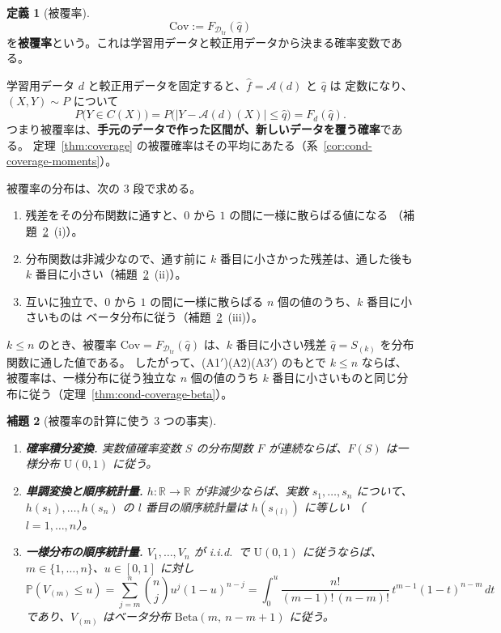 \documentclass[a4paper,11pt]{jsarticle}
\theoremstyle{definition}
\newtheorem{definition}{定義}[section]
\theoremstyle{plain}
\newtheorem{lemma}[definition]{補題}
\theoremstyle{remark}
\newcommand{\Prob}{\mathbb{P}}
\newcommand{\Real}{\mathbb{R}}
\newcommand{\Dtr}{\mathcal{D}_{\mathrm{tr}}}     %
\newcommand{\qhat}{\hat{q}}
\newcommand{\fhat}{\hat{f}}
\begin{document}
\begin{definition}[被覆率]
  \label{def:cond-coverage}
  \begin{equation}
    \label{eq:cond-coverage}
    \mathrm{Cov}:=F_{\Dtr}(\qhat)
  \end{equation}
  を\textbf{被覆率}という。これは学習用データと較正用データから決まる確率変数である。
\end{definition}

学習用データ $d$ と較正用データを固定すると、$\fhat=\mathcal{A}(d)$ と $\qhat$ は
定数になり、$(X,Y)\sim P$ について
\begin{equation*}
  P\bigl(Y\in C(X)\bigr)=P\bigl(|Y-\mathcal{A}(d)(X)|\le\qhat\bigr)=F_d(\qhat).
\end{equation*}
つまり被覆率は、\textbf{手元のデータで作った区間が、新しいデータを覆う確率}である。
定理~\ref{thm:coverage} の被覆確率はその平均にあたる（系~\ref{cor:cond-coverage-moments}）。

被覆率の分布は、次の $3$ 段で求める。
\begin{enumerate}
  \item 残差をその分布関数に通すと、$0$ から $1$ の間に一様に散らばる値になる
    （補題~\ref{lem:beta-tools}~(i)）。
  \item 分布関数は非減少なので、通す前に $k$ 番目に小さかった残差は、通した後も
    $k$ 番目に小さい（補題~\ref{lem:beta-tools}~(ii)）。
  \item 互いに独立で、$0$ から $1$ の間に一様に散らばる $n$ 個の値のうち、$k$ 番目に小さいものは
    ベータ分布に従う（補題~\ref{lem:beta-tools}~(iii)）。
\end{enumerate}
$k\le n$ のとき、被覆率 $\mathrm{Cov}=F_{\Dtr}(\qhat)$ は、$k$ 番目に小さい残差
$\qhat=S_{(k)}$ を分布関数に通した値である。
したがって、(A1$'$)(A2)(A3$'$) のもとで $k\le n$ ならば、被覆率は、一様分布に従う独立な
$n$ 個の値のうち $k$ 番目に小さいものと同じ分布に従う（定理~\ref{thm:cond-coverage-beta}）。

\begin{lemma}[被覆率の計算に使う $3$ つの事実]
  \label{lem:beta-tools}
  \begin{enumerate}
    \item[(i)] \textbf{確率積分変換.}
      実数値確率変数 $S$ の分布関数 $F$ が連続ならば、$F(S)$ は一様分布
      $\mathrm{U}(0,1)$ に従う。
    \item[(ii)] \textbf{単調変換と順序統計量.}
      $h\colon\Real\to\Real$ が非減少ならば、実数 $s_1,\dots,s_n$ について、
      $h(s_1),\dots,h(s_n)$ の $l$ 番目の順序統計量は $h(s_{(l)})$ に等しい
      （$l=1,\dots,n$）。
    \item[(iii)] \textbf{一様分布の順序統計量.}
      $V_1,\dots,V_n$ が i.i.d.\ で $\mathrm{U}(0,1)$ に従うならば、
      $m\in\{1,\dots,n\}$、$u\in[0,1]$ に対し
      \begin{equation}
        \label{eq:uniform-order-stat}
        \Prob(V_{(m)}\le u)=\sum_{j=m}^{n}\binom{n}{j}u^j(1-u)^{n-j}
        =\int_0^u\frac{n!}{(m-1)!\,(n-m)!}\,t^{m-1}(1-t)^{n-m}\,dt
      \end{equation}
      であり、$V_{(m)}$ はベータ分布 $\mathrm{Beta}(m,\ n-m+1)$ に従う。
  \end{enumerate}
\end{lemma}
\end{document}
